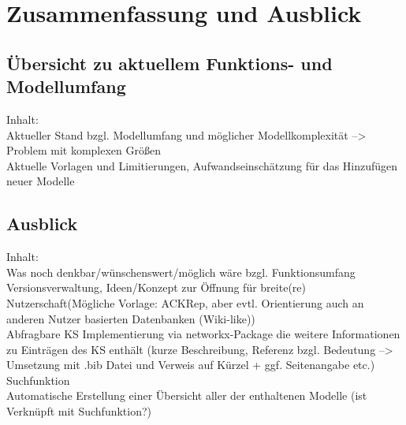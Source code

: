 \chapter{Zusammenfassung und Ausblick}
\section{Übersicht zu aktuellem Funktions- und Modellumfang} 
Inhalt:\\
Aktueller Stand bzgl. Modellumfang und möglicher Modellkomplexität --> Problem mit komplexen Größen \\
Aktuelle Vorlagen und Limitierungen, Aufwandseinschätzung für das Hinzufügen neuer Modelle \\

\section{Ausblick} 
Inhalt: \\
Was noch denkbar/wünschenswert/möglich wäre bzgl. Funktionsumfang \\
Versionsverwaltung, Ideen/Konzept zur Öffnung für breite(re) Nutzerschaft(Mögliche Vorlage: ACKRep, aber evtl. Orientierung auch an anderen Nutzer basierten Datenbanken (Wiki-like))\\ 
Abfragbare KS Implementierung via networkx-Package die weitere Informationen zu Einträgen des KS enthält (kurze Beschreibung, Referenz bzgl. Bedeutung --> Umsetzung mit .bib Datei und Verweis auf Kürzel + ggf. Seitenangabe etc.)\\
Suchfunktion \\
Automatische Erstellung einer Übersicht aller der enthaltenen Modelle (ist Verknüpft mit Suchfunktion?)